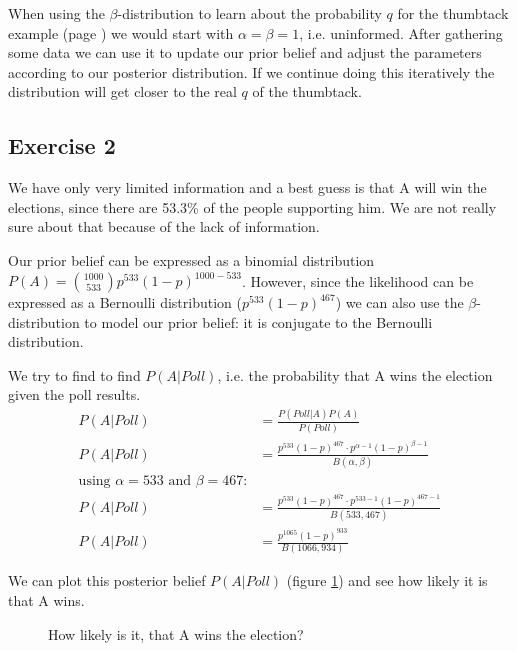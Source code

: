 \bigskip

When using the $\beta$-distribution to learn about the probability $q$ for the thumbtack example (page \pageref{example:Thumbtack Toss}) we would start with $\alpha=\beta=1$, i.e. uninformed. After gathering some data we can use it to update our prior belief and adjust the parameters according to our posterior distribution. If we continue doing this iteratively the distribution will get closer to the real $q$ of the thumbtack.


\subsection*{Exercise 2}
We have only very limited information and a best guess is that A will win the elections, since there are 53.3\% of the people supporting him. We are not really sure about that because of the lack of information.

Our prior belief can be expressed as a binomial distribution $P(A) = \binom{1000}{533} p^{533}(1-p)^{1000-533}$. However, since the likelihood can be expressed as a Bernoulli distribution ($p^{533}(1-p)^{467}$) we can also use the $\beta$-distribution to model our prior belief: it is conjugate to the Bernoulli distribution. 

We try to find to find $P(A|Poll)$, i.e. the probability that A wins the election given the poll results.
\begin{align*}
P(A|Poll) &= \frac{P(Poll|A)P(A)}{P(Poll)}\\
P(A|Poll) &= \frac{p^{533}(1-p)^{467} \cdot p^{\alpha-1}(1-p)^{\beta-1}}{B(\alpha,\beta)}\\
\text{using $\alpha=533$ and $\beta=467$:}\\
P(A|Poll) &= \frac{p^{533}(1-p)^{467} \cdot p^{533-1}(1-p)^{467-1}}{B(533,467)}\\
P(A|Poll) &= \frac{p^{1065}(1-p)^{933}}{B(1066,934)}
\end{align*}

We can plot this posterior belief $P(A|Poll)$ (figure \ref{fig:2014-05-30_ex2plot}) and see how likely it is that A wins.
\begin{figure}[!ht]
\centering
{}
\caption{How likely is it, that A wins the election?}
\label{fig:2014-05-30_ex2plot}
\end{figure}


